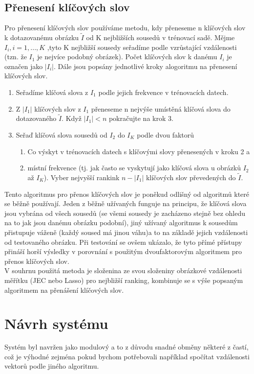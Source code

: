 \documentclass[czech,BP]{thesiskiv}
\begin{document}
\section{Přenesení klíčových slov}
Pro přenesení klíčových slov používáme metodu, kdy přeneseme n klíčových slov k dotazovanému obrázku $\tilde{I}$ od K nejbližších sousedů v trénovací sadě. Mějme $I_{i}, i = 1, ..., K$ ,tyto K nejbližší sousedy seřadíme podle vzrůstající vzdálenosti (tzn. že $I_{1} $ je nejvíce podobný obrázek). Počet klíčových slov k danému $I_{i}$ je označen jako $|I_{i}|$. Dále jsou popsány jednotlivé kroky alogoritmu na přenesení klíčových slov.
\begin{enumerate}
	\item Seřadíme klíčová slova z $I_{1}$ podle jejich frekvence v trénovacích datech.
	\item Z $|I_{1}|$ klíčových slov z $I_{1}$ přeneseme n nejvýše umístěná klíčová slova do dotazovaného $\tilde{I}$. Když $|I_{1}| < n$ pokračujte na krok 3. 
	\item Seřaď klíčová slova sousedů od $I_{2}$ do $I_{K}$ podle dvou faktorů
	\begin{enumerate}
		\item Co výskyt v trénovacích datech s klíčovými slovy přenesených v kroku 2 a
		\item místní frekvence (tj. jak často se vyskytují jako klíčová slova u obrázků $I_{2}$ až $I_{K}$). Vyber nejvyšší rankink $n-|I_{1}|$ klíčových slov převedených do $\tilde{I}$.
	\end{enumerate}
\end{enumerate}

Tento algoritmus pro přenos klíčových slov je poněkud odlišný od algoritmů které se běžně používají. Jeden z běžně užívaných funguje na principu, že klíčová slova jsou vybrána od všech sousedů (se všemi sousedy je zacházeno stejně bez ohledu na to jak jsou danému obrázku podobní), jiný užívaný algoritmus k sousedům přistupuje váženě (každý soused má jinou váhu)a to na základě jejich vzdálenosti od testovaného obrázku. Při testování se ovšem ukázalo, že tyto přímé přístupy přináší horší výsledky v porovnání s použitým dvoufaktorovým algoritmem pro přenos klíčových slov. \\
V souhrnu použitá metoda je složenina ze svou složeniny obrázkové vzdálenosti měřítku (JEC nebo Lasso) pro nejbližší ranking, kombinuje se s výše popsaným algoritmem na přenášení klíčových slov.

\chapter{Návrh systému}
Systém byl navržen jako modulový a to z důvodu snadné obměny některé z častí, což je výhodné zejména pokud bychom potřebovali například spočítat vzdálenosti vektorů podle jiného algoritmu. 
\end{document}
